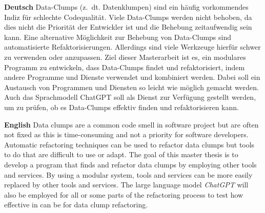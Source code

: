 \textbf{Deutsch}
Data-Clumps (z.~dt. Datenklumpen) sind ein häufig vorkommendes Indiz für schlechte Codequalität. Viele Data-Clumps werden nicht behoben, da dies nicht die Priorität der Entwickler ist und die Behebung zeitaufwendig sein kann. Eine alternative Möglichkeit zur Behebung von Data-Clumps sind automatisierte Refaktorisierungen. Allerdings sind viele Werkzeuge hierfür schwer zu verwenden oder anzupassen. Ziel dieser Masterarbeit ist es, ein modulares Programm zu entwickeln, dass Data-Clumps findet und refaktorisiert, indem andere Programme und Dienste verwendet und kombiniert werden. Dabei soll ein Austausch von Programmen und Diensten so leicht wie möglich gemacht werden. Auch das Sprachmodell ChatGPT soll als Dienst zur Verfügung gestellt werden, um zu prüfen, ob es Data-Clumps effektiv finden und refaktorisieren kann.

\bigskip

\noindent
\textbf{English} 
Data clumps are a common code smell in software project but are often not fixed as this is time-consuming and not a priority for software developers. Automatic refactoring techniques can be used to refactor data clumps but tools to do that are difficult to use or adapt. The goal of this master thesis is to develop a program that finds and refactor data clumps by employing other tools and services. By using a modular system, tools and services can be more easily replaced by other tools and services. The large language model \textit{ChatGPT} will also be employed for all or some parts of the refactoring process to test how effective in can be for data clump refactoring. 
\begin{comment}
The software documentation has become an integral part of software development. Nevertheless, the quality of the documentation is often poor and developers are often not motivated to write good documentation. The goal of this thesis is to develop a tool that can analyze the documentation quality of Java applications by applying different metrics (percentage of documented components in all components, Flesch score, coherence, not mentioning the handling of edge cases). This tool will be integrated in GitHub Actions to warn the developer about poor software documentation quality and to prevent a merge if the quality becomes too poor.  
\end{comment}
